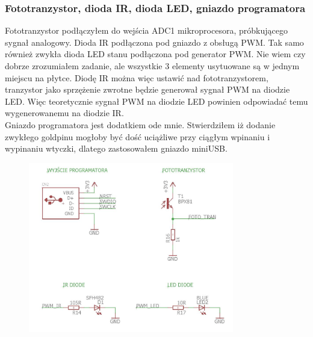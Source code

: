 \documentclass[12pt]{article}
\begin{document}
\subsubsection{Fototranzystor, dioda IR, dioda LED, gniazdo programatora}
Fototranzystor podłączyłem do wejścia ADC1 mikroprocesora, próbkującego sygnał analogowy. Dioda IR podłączona pod gniazdo z obsługą PWM. Tak samo również zwykła dioda LED stanu podłączona pod generator PWM. Nie wiem czy dobrze zrozumiałem zadanie, ale wszystkie 3 elementy usytuowane są w jednym miejscu na płytce. Diodę IR można więc ustawić nad fototranzystorem, tranzystor jako sprzężenie zwrotne będzie generował sygnał PWM na diodzie LED. Więc teoretycznie sygnał PWM na diodzie LED powinien odpowiadać temu wygenerowanemu na diodzie IR.\\
Gniazdo programatora jest dodatkiem ode mnie. Stwierdziłem iż dodanie zwykłego goldpinu mogłoby być dość uciążliwe przy ciągłym wpinaniu i wypinaniu wtyczki, dlatego zastosowałem gniazdo miniUSB. 
\begin{figure}[H]
\begin{center}
\includegraphics[width=0.8\textwidth]{figures/schemat7.jpg}
\end{center}
\end{figure}
\end{document}
